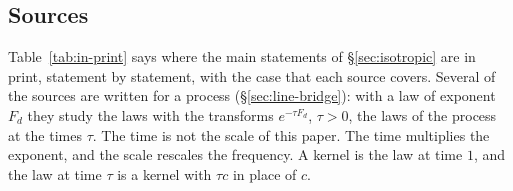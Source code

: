 \subsection{Sources}\label{sec:isotropic-sources}

Table~\ref{tab:in-print} says where the main statements of \S\ref{sec:isotropic} are in print,
statement by statement, with the case that each source covers. Several of the sources are
written for a \Levy{} process (\S\ref{sec:line-bridge}): with a
law of exponent $F_d$ they study the laws with the transforms $e^{-\tau F_d}$, $\tau > 0$, the
laws of the process at the times $\tau$. The time is not the scale of this paper. The time
multiplies the exponent, and the scale rescales the frequency. A kernel is the law at time $1$,
and the law at time $\tau$ is a kernel with $\tau c$ in place of $c$.

